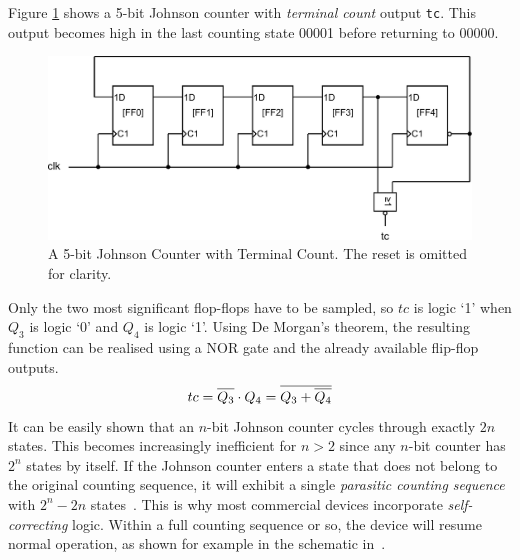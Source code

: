 \documentclass[12pt,a4paper,final,twoside,fleqn]{article}
\newcommand*{\oline}[1]{\overline{#1\mathstrut}}
\begin{document}
Figure \ref{fig:johnsoncounter} shows a 5-bit Johnson counter with \textsl{terminal
count} output \lstinline|tc|. This output becomes high in the last counting state 00001
before returning to 00000.

\begin{figure}[h!]
  \centering
  \includegraphics[scale=0.60]{johnson_5bit}
  \caption[A 5-bit Johnson Counter with Terminal Count]{A 5-bit Johnson Counter
           with Terminal Count. The reset is omitted for clarity.}
  \label{fig:johnsoncounter}
\end{figure}

Only the two most significant flop-flops have to be sampled, so $tc$ is logic
`1' when $Q_3$ is logic `0' and $Q_4$ is logic `1'. Using De Morgan's theorem,
the resulting function can be realised using a NOR gate and the already 
available flip-flop outputs.
%
\begin{equation}
tc = \oline{Q_3} \cdot Q_4 = \oline{Q_3 + \oline{Q_4}}
\end{equation}
%
It can be easily shown that an $n$-bit Johnson counter cycles through exactly
$2n$ states. This becomes increasingly inefficient for $n>2$ since any $n$-bit
counter has $2^n$ states by itself. If the Johnson counter enters a state that
does not belong to the original counting sequence, it will exhibit a single
\textsl{parasitic counting sequence} with $2^n - 2n$
states~\cite{zwolinski2004,wilson2011}. This is why most commercial devices
incorporate \textsl{self-correcting} logic. Within a full counting sequence or
so, the device will resume normal operation, as shown for example in the
schematic in~\cite{datasheetcd4017b}.
\end{document}

